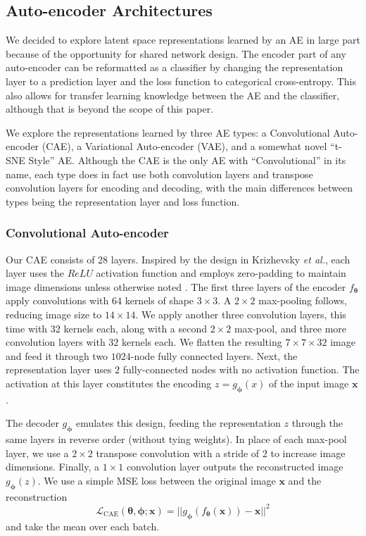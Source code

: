 \documentclass[a4paper]{article}
\def\vec#1{\ensuremath{\bm{{#1}}}}
\begin{document}
\subsection{Auto-encoder Architectures}
\label{sec:auto-encod-arch}

We decided to explore latent space representations learned by an AE in large
part because of the opportunity for shared network design. The encoder part of
any auto-encoder can be reformatted as a classifier by changing the
representation layer to a prediction layer and the loss function to categorical
cross-entropy. This also allows for transfer learning knowledge between the AE
and the classifier, although that is beyond the scope of this paper.

We explore the representations learned by three AE types: a Convolutional
Auto-encoder (CAE), a Variational Auto-encoder (VAE), and a somewhat novel
``t-SNE Style'' AE. Although the CAE is the only AE with ``Convolutional'' in
its name, each type does in fact use both convolution layers and transpose
convolution layers for encoding and decoding, with the main differences between
types being the representation layer and loss function.

\subsubsection{Convolutional Auto-encoder}
\label{sec:conv-auto-encod}

Our CAE consists of 28 layers. Inspired by the design in Krizhevsky \emph{et
  al.}, each layer uses the $ReLU$ activation function and employs zero-padding
to maintain image dimensions unless otherwise noted
\cite{krizhevsky_imagenet_2012, nair_rectified_nodate}. The first three layers
of the encoder $f_{\vec{\theta}}$ apply convolutions with $64$ kernels of shape
$3\times 3$. A $2\times 2$ max-pooling follows, reducing image size to
$14\times 14$. We apply another three convolution layers, this time with $32$
kernels each, along with a second $2\times 2$ max-pool, and three more
convolution layers with $32$ kernels each. We flatten the resulting
$7 \times 7 \times 32$ image and feed it through two $1024$-node fully connected
layers. Next, the representation layer uses $2$ fully-connected nodes with no
activation function. The activation at this layer constitutes the encoding
$z = g_{\vec{\phi}}(x)$ of the input image $\vec{x}$.

The decoder $g_{\vec{\phi}}$ emulates this design, feeding the representation
$z$ through the same layers in reverse order (without tying weights). In place
of each max-pool layer, we use a $2\times 2$ transpose convolution with a stride
of $2$ to increase image dimensions. Finally, a $1\times 1$ convolution layer
outputs the reconstructed image $g_{\vec{\phi}}(z)$. We use a simple MSE loss
between the original image $\vec{x}$ and the reconstruction
\begin{equation}
  \label{eq:1}
  \mathcal{L}_{\text{CAE}}(\vec{\theta}, \vec{\phi};\vec{x}) =
  ||g_{\vec{\phi}}(f_{\vec{\theta}}(\vec{x})) - \vec{x}||^2
\end{equation}
and take the mean over each batch.
\end{document}
